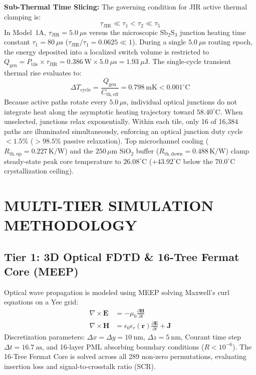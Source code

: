 \documentclass[journal]{IEEEtran}
\begin{document}
\textbf{Sub-Thermal Time Slicing:} The governing condition for JIR active thermal clamping is:
\begin{equation}
    \tau_{\mathrm{JIR}} \ll \tau_1 < \tau_2 \ll \tau_5
\end{equation}
In Model~1A, $\tau_{\mathrm{JIR}} = 5.0~\mu\mathrm{s}$ versus the microscopic $\mathrm{Sb_2S_3}$ junction heating time constant $\tau_1 = 80~\mu\mathrm{s}$ ($\tau_{\mathrm{JIR}} / \tau_1 = 0.0625 \ll 1$). During a single $5.0~\mu\mathrm{s}$ routing epoch, the energy deposited into a localized switch volume is restricted to $Q_{\mathrm{gen}} = P_{\mathrm{tile}} \times \tau_{\mathrm{JIR}} = 0.386~\mathrm{W} \times 5.0~\mu\mathrm{s} = 1.93~\mu\mathrm{J}$. The single-cycle transient thermal rise evaluates to:
\begin{equation}
    \Delta T_{\mathrm{cycle}} = \frac{Q_{\mathrm{gen}}}{C_{\mathrm{th,eff}}} = 0.798~\mathrm{mK} < 0.001^\circ\mathrm{C}
\end{equation}
Because active paths rotate every $5.0\,\mu\mathrm{s}$, individual optical junctions do not integrate heat along the asymptotic heating trajectory toward $58.40^\circ\mathrm{C}$. When unselected, junctions relax exponentially. Within each tile, only 16 of 16,384 paths are illuminated simultaneously, enforcing an optical junction duty cycle $<1.5\%$ ($>98.5\%$ passive relaxation). Top microchannel cooling ($R_{\mathrm{th,up}} = 0.227\,\mathrm{K/W}$) and the $250\,\mu\mathrm{m}$ $\mathrm{SiO_2}$ buffer ($R_{\mathrm{th,down}} = 0.488\,\mathrm{K/W}$) clamp steady-state peak core temperature to $26.08^\circ\mathrm{C}$ ($+43.92^\circ\mathrm{C}$ below the $70.0^\circ\mathrm{C}$ crystallization ceiling).

\section{MULTI-TIER SIMULATION METHODOLOGY}

\subsection{Tier 1: 3D Optical FDTD \& 16-Tree Fermat Core (MEEP)}
Optical wave propagation is modeled using MEEP \cite{Oskooi2010} solving Maxwell's curl equations on a Yee grid:
\begin{align}
    \nabla \times \mathbf{E} &= -\mu_0 \frac{\partial \mathbf{H}}{\partial t} \\
    \nabla \times \mathbf{H} &= \epsilon_0 \epsilon_r(\mathbf{r}) \frac{\partial \mathbf{E}}{\partial t} + \mathbf{J}
\end{align}
Discretization parameters: $\Delta x = \Delta y = 10~\mathrm{nm}$, $\Delta z = 5~\mathrm{nm}$, Courant time step $\Delta t = 16.7~\mathrm{as}$, and 16-layer PML absorbing boundary conditions ($R < 10^{-6}$). The 16-Tree Fermat Core is solved across all 289 non-zero permutations, evaluating insertion loss and signal-to-crosstalk ratio (SCR).
\end{document}
